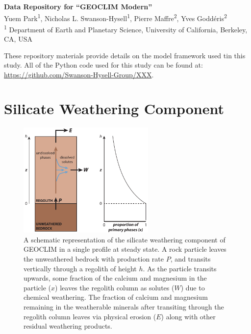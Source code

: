 \documentclass[11pt,letterpaper]{article}
\begin{document}
\begin{flushleft}
{\Large \textbf{Data Repository for ``GEOCLIM Modern''}}
\\
Yuem Park\textsuperscript{1},
Nicholas L. Swanson-Hysell\textsuperscript{1},
Pierre Maffre\textsuperscript{2},
Yves Godd\'eris\textsuperscript{2}
\\
\bigskip
\textsuperscript{1} Department of Earth and Planetary Science, University of California, Berkeley, CA, USA
\\
\bigskip

\end{flushleft}

\linenumbers

These repository materials provide details on the model framework used tin this study. All of the Python code used for this study can be found at: \url{https://github.com/Swanson-Hysell-Group/XXX}.

\section*{Silicate Weathering Component}

\begin{figure}
\begin{center}
	\includegraphics[width=0.6\textwidth]{../Figures/regolith_schematic.pdf}
	\caption{A schematic representation of the silicate weathering component of GEOCLIM in a single profile at steady state. A rock particle leaves the unweathered bedrock with production rate $P$, and transits vertically through a regolith of height $h$. As the particle transits upwards, some fraction of the calcium and magnesium in the particle ($x$) leaves the regolith column as solutes ($W$) due to chemical weathering. The fraction of calcium and magnesium remaining in the weatherable minerals after transiting through the regolith column leaves via physical erosion ($E$) along with other residual weathering products.}
	\label{fig:regolith_schematic}
\end{center}
\end{figure}
\end{document}
